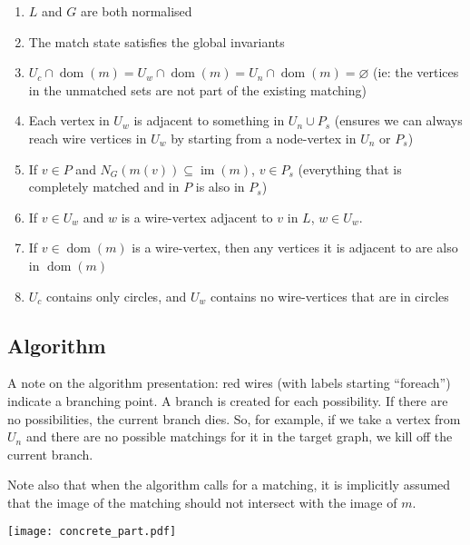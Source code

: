 \documentclass{article}
\DeclareMathOperator{\dom}{dom}
\DeclareMathOperator{\im}{im}
\begin{document}
\begin{enumerate}
  \renewcommand{\theenumi}{(\roman{enumi})}
  \renewcommand{\labelenumi}{\theenumi}
  \item \label{enum:il-inv-norm} $L$ and $G$ are both normalised
  \item \label{enum:il-inv-inv} The match state satisfies the global invariants
  \item \label{enum:il-inv-unmatched} $U_c\cap\dom(m) = U_w\cap\dom(m) = U_n\cap\dom(m) = \varnothing$ (ie: the vertices in the unmatched sets are not part of the existing matching)
  \item \label{enum:il-inv-reachable} Each vertex in $U_w$ is adjacent to something in $U_n\cup P_s$ (ensures we can always reach wire vertices in $U_w$ by starting from a node-vertex in $U_n$ or $P_s$)
  \item \label{enum:il-inv-Ps} If $v \in P$ and $N_G(m(v)) \subseteq \im(m)$, $v \in P_s$ (everything that is completely matched and in $P$ is also in $P_s$)
  \item \label{enum:il-inv-wire-uw} If $v \in U_w$ and $w$ is a wire-vertex adjacent to $v$ in $L$, $w \in U_w$.
  \item \label{enum:il-inv-wire-connected} If $v \in \dom(m)$ is a wire-vertex, then any vertices it is adjacent to are also in $\dom(m)$
  \item \label{enum:il-inv-circles} $U_c$ contains only circles, and $U_w$ contains no wire-vertices that are in circles
\end{enumerate}

\subsection{Algorithm}

A note on the algorithm presentation: red wires (with labels starting ``foreach'') indicate a branching point.  A branch is created for each possibility.  If there are no possibilities, the current branch dies.  So, for example, if we take a vertex from $U_n$ and there are no possible matchings for it in the target graph, we kill off the current branch.

Note also that when the algorithm calls for a matching, it is implicitly assumed that the image of the matching should not intersect with the image of $m$.

\begin{center}
  \texttt{[image: concrete\_part.pdf]}
\end{center}
\end{document}
